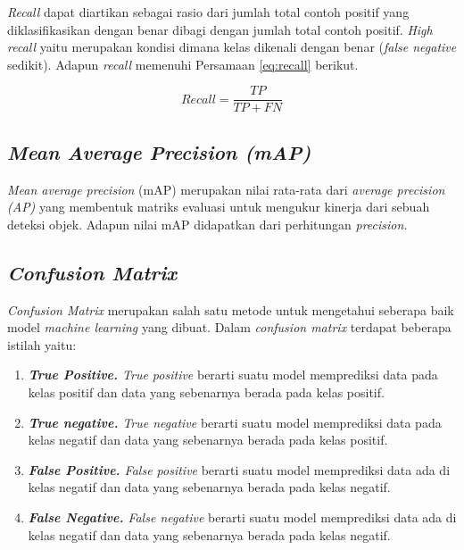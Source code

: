 \textit{Recall} dapat diartikan sebagai rasio dari jumlah total contoh positif yang diklasifikasikan dengan benar dibagi dengan jumlah total contoh positif. \textit{High recall} yaitu merupakan kondisi dimana kelas dikenali dengan benar (\textit{false negative} sedikit). Adapun \textit{recall} memenuhi Persamaan \ref*{eq:recall} berikut.

\begin{equation}
    \label{eq:recall}
    Recall=\frac{TP}{TP + FN}
\end{equation}

\subsection{\textit{Mean Average Precision (mAP)}}
\label{subsec:meanaverageprecision}

\textit{Mean average precision} (mAP) merupakan nilai rata-rata dari \textit{average precision (AP)} yang membentuk matriks evaluasi untuk mengukur kinerja dari sebuah deteksi objek. Adapun nilai mAP didapatkan dari perhitungan \textit{precision.}

\subsection{\textit{Confusion Matrix}}
\label{subsec:confusionmetrics}

\textit{Confusion Matrix} merupakan salah satu metode untuk mengetahui seberapa baik model \textit{machine learning} yang dibuat. Dalam \textit{confusion matrix} terdapat beberapa istilah yaitu:
\begin{enumerate}[nolistsep]
    \item \textit{\textbf{True Positive.} True positive} berarti suatu model memprediksi data pada kelas positif dan data yang sebenarnya berada pada kelas positif.
    \item \textit{\textbf{True negative.} True negative} berarti suatu model memprediksi data pada kelas negatif dan data yang sebenarnya berada pada kelas positif.
    \item \textit{\textbf{False Positive.} False positive} berarti suatu model memprediksi data ada di kelas negatif dan data yang sebenarnya berada pada kelas negatif.
    \item \textit{\textbf{False Negative.} False negative} berarti suatu model memprediksi data ada di kelas negatif dan data yang sebenarnya berada pada kelas negatif.
\end{enumerate}

